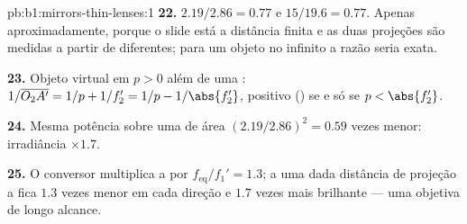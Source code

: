 \begin{solution}{pb:b1:mirrors-thin-lenses:1}
\textbf{22.} $2.19/2.86 = 0.77$ e $15/19.6 = 0.77$. Apenas aproximadamente,
porque o slide está a distância finita e as duas projeções são medidas
a partir de  diferentes; para um objeto no infinito a razão seria
exata.

\textbf{23.} Objeto virtual em $p > 0$ além de uma :
$1/\overline{O_2A'} = 1/p + 1/f_2' = 1/p - 1/\abs{f_2'}$, positivo () se e só se $p < \abs{f_2'}$.

\textbf{24.} Mesma potência sobre uma  de área $(2.19/2.86)^2 = 0.59$
vezes menor: irradiância $\times 1.7$.

\textbf{25.} O conversor multiplica a  por
$f_{\mathrm{eq}}/f_1' = 1.3$; a uma dada distância de projeção a  fica $1.3$
vezes menor em cada direção e $1.7$ vezes mais brilhante --- uma
objetiva de longo alcance.
\end{solution}
